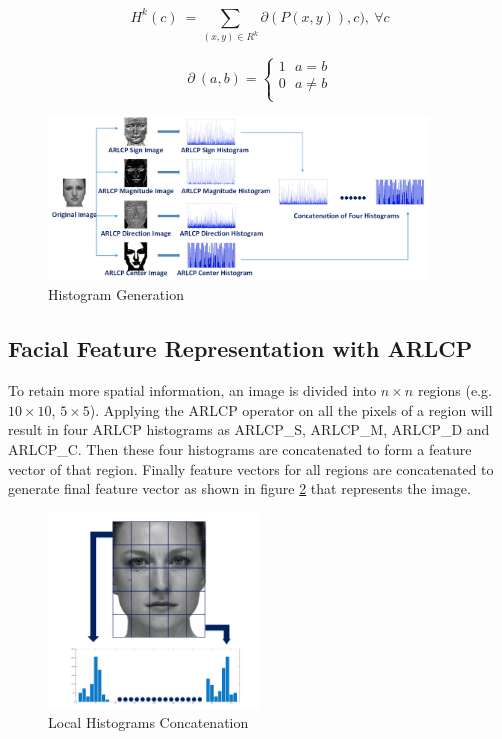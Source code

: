 \documentclass[12pt]{article}
\begin{document}
\begin{equation}
{{H}^{k}}(c)~=\sum\limits_{(x,y)\in {{R}^{k}}}{\partial (P(x,y)),c),}~\forall c
\label{histo1}
\end{equation}

\begin{equation}
\partial ~(a,b)=\left\{ \begin{matrix}
1 ~~~ a=b  \\
0 ~~~ a\ne b  \\
\end{matrix} \right.
\label{histo2}
\end{equation}
\vspace*{0.5cm}
\begin{figure}[H]
	\centering
	\includegraphics[width=0.9\textwidth]{histogram_generation.png}
	\caption{Histogram Generation}
	\label{fig:histogram_generation}	
\end{figure}	

\subsection{Facial Feature Representation with ARLCP}
To retain more spatial information, an image is divided into $n\times n$ regions (e.g. $10 \times 10$, $5 \times 5$).
Applying the ARLCP operator on all the pixels of a region will result in four ARLCP histograms as ARLCP\_S, ARLCP\_M, ARLCP\_D and ARLCP\_C. Then these four histograms are concatenated to form a feature vector of that region. Finally feature vectors for all regions are concatenated to generate final feature vector as shown in figure \ref{fig:Local_histogram} that represents the image.
\vspace*{0.5cm}
\begin{figure}[H]
	\begin{center}
		\centering
		\includegraphics[width=0.5\textwidth]{Local_histogram.png}
		\caption{Local Histograms Concatenation}
		\label{fig:Local_histogram}
	\end{center}
\end{figure}
\end{document}
